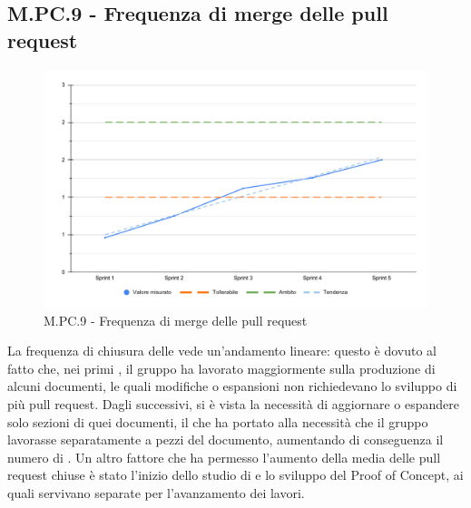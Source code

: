 \subsection{M.PC.9 - Frequenza di merge delle pull request}
\begin{figure}[H]
    \centering
    \includegraphics[width=\textwidth]{assets/frequenza_pull_request.pdf}
    \caption{M.PC.9 - Frequenza di merge delle pull request}
\end{figure}

\par La frequenza di chiusura delle  vede un'andamento lineare: questo è dovuto al fatto che, nei primi , il gruppo ha lavorato maggiormente sulla produzione di alcuni documenti, le quali modifiche o espansioni non richiedevano lo sviluppo di più pull request. Dagli  successivi, si è vista la necessità di aggiornare o espandere solo sezioni di quei documenti, il che ha portato alla necessità che il gruppo lavorasse separatamente a pezzi del documento, aumentando di conseguenza il numero di . Un altro fattore che ha permesso l'aumento della media delle pull request chiuse è stato l'inizio dello studio di  e lo sviluppo del Proof of Concept, ai quali servivano  separate per l'avanzamento dei lavori.